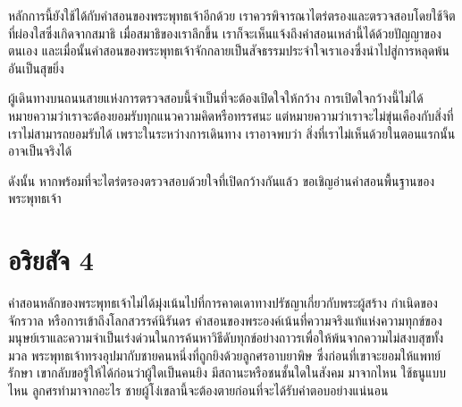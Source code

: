 \documentclass[12pt, openany]{book}
\begin{document}
หลักการ{\wbr}นี้{\wbr}ยัง{\wbr}ใช้{\wbr}ได้{\wbr}กับ{\wbr}คํา{\wbr}สอน{\wbr}ของ{\wbr}พระพุทธเจ้า{\wbr}อีก{\wbr}ด้วย  เรา{\wbr}ควร{\wbr}พิจารณา{\wbr}ไตร่ตรอง{\wbr}และ{\wbr}ตรวจสอบ{\wbr}โดย{\wbr}ใช้{\wbr}จิต{\wbr}ที่{\wbr}ผ่องใส{\wbr}ซึ่ง{\wbr}เกิด{\wbr}จาก{\wbr}สมาธิ  เมื่อ{\wbr}สมาธิ{\wbr}ของ{\wbr}เรา{\wbr}ลึก{\wbr}ขึ้น เรา{\wbr}ก็{\wbr}จะ{\wbr}เห็น{\wbr}แจ้ง{\wbr}ถึง{\wbr}คํา{\wbr}สอน{\wbr}เหล่า{\wbr}นี้{\wbr}ได้{\wbr}ด้วย{\wbr}ปัญญา{\wbr}ของ{\wbr}ตนเอง และ{\wbr}เมื่อนั้น{\wbr}คํา{\wbr}สอน{\wbr}ของ{\wbr}พระพุทธเจ้า{\wbr}จัก{\wbr}กลาย{\wbr}เป็น{\wbr}สัจธรรม{\wbr}ประจำ{\wbr}ใจ{\wbr}เรา{\wbr}เอง{\wbr}ซึ่ง{\wbr}นำ{\wbr}ไป{\wbr}สู่{\wbr}การ{\wbr}หลุดพ้น{\wbr}อัน{\wbr}เป็น{\wbr}สุข{\wbr}ยิ่ง{\wbr}

ผู้{\wbr}เดินทาง{\wbr}บน{\wbr}ถนน{\wbr}สาย{\wbr}แห่ง{\wbr}การ{\wbr}ตรวจสอบ{\wbr}นี้{\wbr}จำเป็น{\wbr}ที่{\wbr}จะ{\wbr}ต้อง{\wbr}เปิด{\wbr}ใจ{\wbr}ให้{\wbr}กว้าง  การ{\wbr}เปิด{\wbr}ใจ{\wbr}กว้าง{\wbr}นี้{\wbr}ไม่{\wbr}ได้{\wbr}หมายความ{\wbr}ว่า{\wbr}เรา{\wbr}จะ{\wbr}ต้อง{\wbr}ยอมรับ{\wbr}ทุก{\wbr}แนว{\wbr}ความคิด{\wbr}หรือ{\wbr}ทรรศนะ  แต่{\wbr}หมายความ{\wbr}ว่า{\wbr}เรา{\wbr}จะ{\wbr}ไม่{\wbr}ขุ่น{\wbr}เคือง{\wbr}กับ{\wbr}สิ่ง{\wbr}ที่{\wbr}เรา{\wbr}ไม่{\wbr}สามารถ{\wbr}ยอมรับ{\wbr}ได้ เพราะ{\wbr}ใน{\wbr}ระหว่าง{\wbr}การ{\wbr}เดินทาง เรา{\wbr}อาจ{\wbr}พบ{\wbr}ว่า สิ่ง{\wbr}ที่{\wbr}เรา{\wbr}ไม่{\wbr}เห็นด้วย{\wbr}ใน{\wbr}ตอน{\wbr}แรก{\wbr}นั้น{\wbr}อาจ{\wbr}เป็น{\wbr}จริง{\wbr}ได้  

ดังนั้น หาก{\wbr}พร้อม{\wbr}ที่{\wbr}จะ{\wbr}ไตร่ตรอง{\wbr}ตรวจสอบ{\wbr}ด้วย{\wbr}ใจ{\wbr}ที่{\wbr}เปิด{\wbr}กว้าง{\wbr}กัน{\wbr}แล้ว ขอ{\wbr}เชิญ{\wbr}อ่าน{\wbr}คํา{\wbr}สอน{\wbr}พื้นฐาน{\wbr}ของ{\wbr}พระพุทธเจ้า{\wbr}

\section{อริยสัจ 4}


คําสอน{\wbr}หลัก{\wbr}ของ{\wbr}พระพุทธเจ้า{\wbr}ไม่{\wbr}ได้{\wbr}มุ่ง{\wbr}เน้น{\wbr}ไป{\wbr}ที่{\wbr}การ{\wbr}คาด{\wbr}เดา{\wbr}ทาง{\wbr}ปรัชญา{\wbr}เกี่ยว{\wbr}กับ{\wbr}พระ{\wbr}ผู้{\wbr}สร้าง กําเนิดของ{\wbr}จักรวาล หรือ{\wbr}การ{\wbr}เข้าถึง{\wbr}โลก{\wbr}สวรรค์{\wbr}นิรันดร  คําสอน{\wbr}ของ{\wbr}พระองค์{\wbr}เน้น{\wbr}ที่{\wbr}ความ{\wbr}จริง{\wbr}แท้{\wbr}แห่ง{\wbr}ความ{\wbr}ทุกข์{\wbr}ของ{\wbr}มนุษย์{\wbr}เรา{\wbr}และ{\wbr}ความ{\wbr}จํา{\wbr}เป็น{\wbr}เร่งด่วน{\wbr}ใน{\wbr}การ{\wbr}ค้น{\wbr}หา{\wbr}วิธี{\wbr}ดับ{\wbr}ทุกข์{\wbr}อย่าง{\wbr}ถาวร{\wbr}เพื่อ{\wbr}ให้{\wbr}พ้น{\wbr}จาก{\wbr}ความ{\wbr}ไม่{\wbr}สงบสุข{\wbr}ทั้งมวล  พระพุทธเจ้า{\wbr}ทรง{\wbr}อุปมา{\wbr}กับ{\wbr}ชาย{\wbr}คน{\wbr}หนึ่ง{\wbr}ที่{\wbr}ถูก{\wbr}ยิง{\wbr}ด้วย{\wbr}ลูกศร{\wbr}อาบ{\wbr}ยาพิษ ซึ่ง{\wbr}ก่อน{\wbr}ที่{\wbr}เขา{\wbr}จะ{\wbr}ยอม{\wbr}ให้{\wbr}แพทย์{\wbr}รักษา เขา{\wbr}กลับ{\wbr}ขอ{\wbr}รู้{\wbr}ให้{\wbr}ได้{\wbr}ก่อน{\wbr}ว่า{\wbr}ผู้{\wbr}ใด{\wbr}เป็น{\wbr}คน{\wbr}ยิง มี{\wbr}สถานะ{\wbr}หรือ{\wbr}ชน{\wbr}ชั้น{\wbr}ใด{\wbr}ใน{\wbr}สังคม มา{\wbr}จาก{\wbr}ไหน ใช้{\wbr}ธนู{\wbr}แบบ{\wbr}ไหน ลูกศร{\wbr}ทํา{\wbr}มา{\wbr}จาก{\wbr}อะไร  ชาย{\wbr}ผู้{\wbr}โง่เขลา{\wbr}นี้{\wbr}จะ{\wbr}ต้อง{\wbr}ตาย{\wbr}ก่อน{\wbr}ที่{\wbr}จะ{\wbr}ได้{\wbr}รับ{\wbr}คํา{\wbr}ตอบ{\wbr}อย่าง{\wbr}แน่นอน{\wbr}
\end{document}
